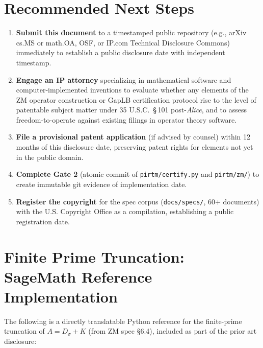 \documentclass[12pt,letterpaper]{article}
\theoremstyle{definition}
\theoremstyle{remark}
\begin{document}
\section{Recommended Next Steps}
\label{sec:next}

\begin{enumerate}[leftmargin=*]
  \item \textbf{Submit this document} to a timestamped public repository
        (e.g., arXiv cs.MS or math.OA, OSF, or IP.com Technical Disclosure
        Commons) immediately to establish a public disclosure date with
        independent timestamp.

  \item \textbf{Engage an IP attorney} specializing in mathematical software
        and computer-implemented inventions to evaluate whether any elements
        of the ZM operator construction or GapLB certification protocol
        rise to the level of patentable subject matter under
        35 U.S.C.~\S\,101 post-\textit{Alice}, and to assess freedom-to-operate
        against existing filings in operator theory software.

  \item \textbf{File a provisional patent application} (if advised by counsel)
        within 12 months of this disclosure date, preserving patent rights
        for elements not yet in the public domain.

  \item \textbf{Complete Gate 2} (atomic commit of \texttt{pirtm/certify.py}
        and \texttt{pirtm/zm/}) to create immutable git evidence of
        implementation date.

  \item \textbf{Register the copyright} for the spec corpus
        (\texttt{docs/specs/}, 60+ documents) with the U.S. Copyright Office
        as a compilation, establishing a public registration date.
\end{enumerate}


\appendix

\section{Finite Prime Truncation: SageMath Reference Implementation}
\label{app:sage}

The following is a directly translatable Python reference for the finite-prime
truncation of $A = D_\sigma + K$ (from ZM spec \S6.4), included as part of
the prior art disclosure:
\end{document}

